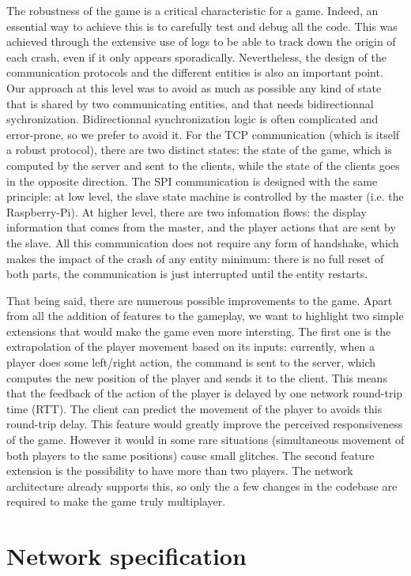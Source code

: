 \documentclass[english, DIV=13]{scrreprt}
\begin{document}
The robustness of the game is a critical characteristic for a game. Indeed, an
essential way to achieve this is to carefully test and debug all the code. This
was achieved through the extensive use of logs to be able to track down the
origin of each crash, even if it only appears sporadically.  Nevertheless, the
design of the communication protocols and the different entities is also an
important point. Our approach at this level was to avoid as much as possible any
kind of state that is shared by two communicating entities, and that needs
bidirectionnal sychronization.  Bidirectionnal synchronization logic is often
complicated and error-prone, so we prefer to avoid it.  For the TCP
communication (which is itself a robust protocol), there are two distinct
states: the state of the game, which is computed by the server and sent to the
clients, while the state of the clients goes in the opposite direction.  The SPI
communication is designed with the same principle: at low level, the slave state
machine is controlled by the master (i.e. the Raspberry-Pi). At higher level,
there are two infomation flows: the display information that comes from the
master, and the player actions that are sent by the slave. All this
communication does not require any form of handshake, which makes the impact of
the crash of any entity minimum: there is no full reset of both parts, the
communication is just interrupted until the entity restarts.

That being said, there are numerous possible improvements to the game. Apart
from all the addition of features to the gameplay, we want to highlight two
simple extensions that would make the game even more intersting.  The first one
is the extrapolation of the player movement based on its inputs: currently, when
a player does some left/right action, the command is sent to the server, which
computes the new position of the player and sends it to the client. This means
that the feedback of the action of the player is delayed by one network
round-trip time (RTT). The client can predict the movement of the player to
avoids this round-trip delay.  This feature would greatly improve the perceived
responsiveness of the game. However it would in some rare situations
(simultaneous movement of both players to the same positions) cause small
glitches.  The second feature extension is the possibility to have more than two
players. The network architecture already supports this, so only the a few
changes in the codebase are required to make the game truly multiplayer.

\appendix

\section{Network specification}
\end{document}
